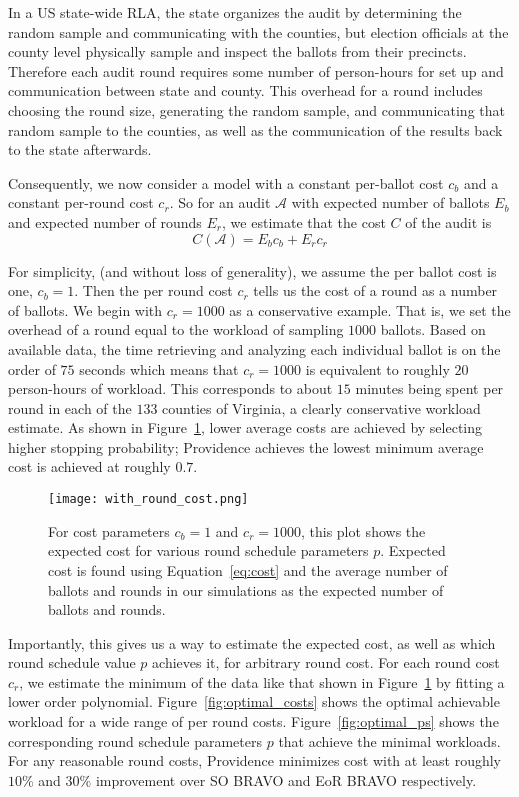 In a US state-wide RLA, the state organizes the audit by determining the random sample and communicating with the counties, but election officials at the county level physically sample and inspect the ballots from their precincts. 
Therefore each audit round requires some number of person-hours for set up and communication between state and county. This overhead for a round includes choosing the round size, generating the random sample, and communicating that random sample to the counties, as well as the communication of the results back to the state afterwards. 

Consequently, we now consider a model with a constant per-ballot cost $c_b$ and a constant per-round cost $c_r$.
So for an audit $\mathcal{A}$ with expected number of ballots $E_{b}$ and expected number of rounds $E_{r}$, we estimate that the cost $C$ of the audit is
\begin{equation}
C(\mathcal{A}) = E_b c_b + E_r c_r
\label{eq:round_cost}
\end{equation}

For simplicity, (and without loss of generality), we assume the per ballot cost is one, $c_b=1$. Then the per round cost $c_r$ tells us the cost of a round as a number of ballots. We begin with $c_r=1000$ as a conservative example. 
That is, we set the overhead of a round equal to the workload of sampling $1000$ ballots. Based on available data\cite{RI-report}, the time retrieving and analyzing each individual ballot is on the order of $75$ seconds which means that $c_r=1000$ is equivalent to roughly $20$ person-hours of workload. This corresponds to about $15$ minutes being spent per round in each of the $133$ counties of Virginia, a clearly conservative workload estimate. 
As shown in Figure~\ref{fig:with_round_cost}, lower average costs are achieved by selecting higher stopping probability; Providence achieves the lowest minimum average cost is achieved at roughly $0.7$.

\begin{figure}
\texttt{[image: with\_round\_cost.png]}
\caption{For cost parameters $c_b=1$ and $c_r=1000$, this plot shows the expected cost for various round schedule parameters $p$. Expected cost is found using Equation~\ref{eq:cost} and the average number of ballots and rounds in our simulations as the expected number of ballots and rounds.}
\label{fig:with_round_cost}
\end{figure}

Importantly, this gives us a way to estimate the expected cost, as well as which round schedule value $p$ achieves it, for arbitrary round cost. For each round cost $c_r$, we estimate the minimum of the data like that shown in Figure~\ref{fig:with_round_cost} by fitting a lower order polynomial.
Figure~\ref{fig:optimal_costs} shows the optimal achievable workload for a wide range of per round costs. Figure~\ref{fig:optimal_ps} shows the corresponding round schedule parameters $p$ that achieve the minimal workloads. For any reasonable round costs, Providence minimizes cost with at least roughly $10\%$ and $30\%$ improvement over SO BRAVO and EoR BRAVO respectively.

